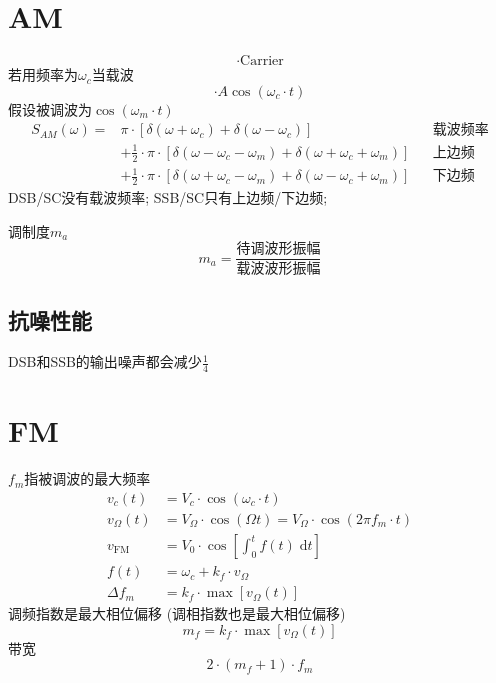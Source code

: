 \documentclass[a4paper]{report}
\begin{document}
\section{AM}
\begin{equation}
  [1+m(t)]\cdot \text{Carrier}
\end{equation}
若用频率为$\omega_c$当载波
\begin{equation}
  [1+m(t)]\cdot A\cos{(\omega_c\cdot t)}
\end{equation}
假设被调波为$\cos(\omega_m\cdot t)$
\begin{align*}
  S_{AM}(\omega)=& \pi\cdot [\delta(\omega+\omega_c)+\delta(\omega-\omega_c)]&&\text{载波频率}
  \\ &+ \frac{1}{2}\cdot\pi\cdot [\delta(\omega-\omega_c-\omega_m)+\delta(\omega+\omega_c+\omega_m)]&&\text{上边频}
  \\ &+ \frac{1}{2}\cdot\pi\cdot [\delta(\omega+\omega_c-\omega_m)+\delta(\omega-\omega_c+\omega_m)]&&\text{下边频}
\end{align*}
DSB/SC没有载波频率; SSB/SC只有上边频/下边频;

调制度$m_a$
\begin{equation}
  m_a=\frac{\text{待调波形振幅}}{\text{载波波形振幅}}
\end{equation}
\subsection{抗噪性能}
DSB和SSB的输出噪声都会减少$\frac{1}{4}$
\section{FM}
$f_m$指被调波的最大频率
\begin{align*}
    v_c(t)&=V_c\cdot\cos(\omega_c\cdot t)
    \\ v_\Omega(t)&=V_\Omega\cdot\cos(\Omega t)=V_\Omega\cdot\cos(2\pi f_m\cdot t)
    \\ v_{\text{FM}}&=V_0\cdot\cos[\int_0^{t} f(t)\; \text{d}t]
    \\ f(t)&=\omega_c+k_f\cdot v_\Omega
    \\ \Delta f_m &= k_f\cdot \max[v_\Omega(t)]
\end{align*}
调频指数是最大相位偏移 (调相指数也是最大相位偏移)
\begin{equation}
  m_f=k_f\cdot \max[v_\Omega(t)]
\end{equation}
带宽
\begin{equation}
  2\cdot (m_f+1)\cdot f_m
\end{equation}
\end{document}
